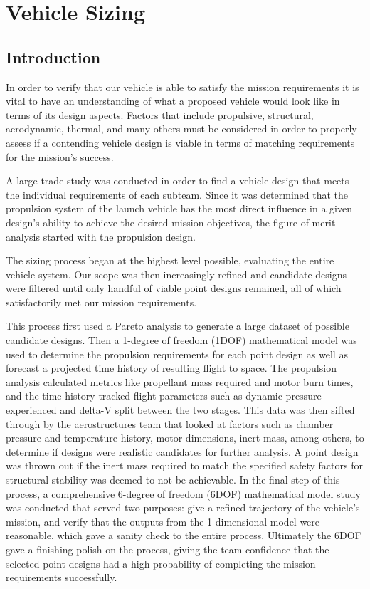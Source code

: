 \section{Vehicle Sizing} \label{section:sizing}
\subsection{Introduction}
In order to verify that our vehicle is able to satisfy the mission requirements it is vital to have an understanding of what a proposed vehicle would look like in terms of its design aspects. Factors that include propulsive, structural, aerodynamic, thermal, and many others must be considered in order to properly assess if a contending vehicle design is viable in terms of matching requirements for the mission's success.

A large trade study was conducted in order to find a vehicle design that meets the individual requirements of each subteam. Since it was determined that the propulsion system of the launch vehicle has the most direct influence in a given design's ability to achieve the desired mission objectives, the figure of merit analysis started with the propulsion design.

The sizing process began at the highest level possible, evaluating the entire vehicle system. Our scope was then increasingly refined and candidate designs were filtered until only handful of viable point designs remained, all of which satisfactorily met our mission requirements.

This process first used a Pareto analysis to generate a large dataset of possible candidate designs. Then a 1-degree of freedom (1DOF) mathematical model was used to determine the propulsion requirements for each point design as well as forecast a projected time history of resulting flight to space. The propulsion analysis calculated metrics like propellant mass required and motor burn times, and the time history tracked flight parameters such as dynamic pressure experienced and delta-V split between the two stages. This data was then sifted through by the aerostructures team that looked at factors such as chamber pressure and temperature history, motor dimensions, inert mass, among others, to determine if designs were realistic candidates for further analysis. A point design was thrown out if the inert mass required to match the specified safety factors for structural stability was deemed to not be achievable. In the final step of this process, a comprehensive 6-degree of freedom (6DOF) mathematical model study was conducted that served two purposes: give a refined trajectory of the vehicle’s mission, and verify that the outputs from the 1-dimensional model were reasonable, which gave a sanity check to the entire process. Ultimately the 6DOF gave a finishing polish on the process, giving the team confidence that the selected point designs had a high probability of completing the mission requirements successfully.

